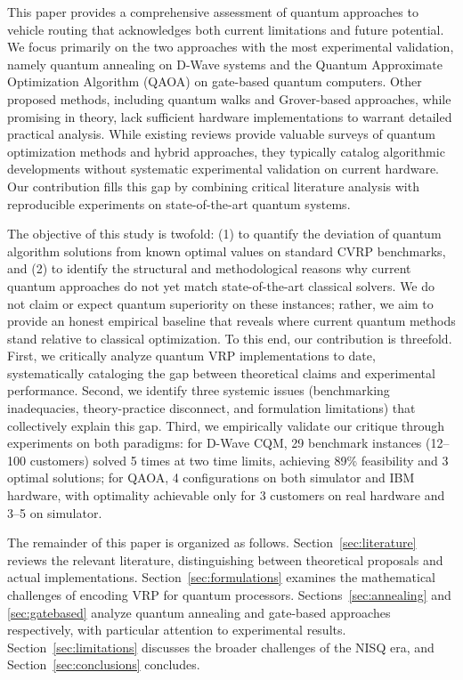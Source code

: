 \documentclass[preprint,3p,12pt,authoryear]{elsarticle}
\begin{document}
This paper provides a comprehensive assessment of quantum approaches to vehicle routing that acknowledges both current limitations and future potential. We focus primarily on the two approaches with the most experimental validation, namely quantum annealing on D-Wave systems and the Quantum Approximate Optimization Algorithm (QAOA) on gate-based quantum computers. Other proposed methods, including quantum walks and Grover-based approaches, while promising in theory, lack sufficient hardware implementations to warrant detailed practical analysis. While existing reviews \citep{yarkoni2022quantum, cerezo2021variational,smartcities8060206,10918658,10087522} provide valuable surveys of quantum optimization methods and hybrid approaches, they typically catalog algorithmic developments without systematic experimental validation on current hardware. Our contribution fills this gap by combining critical literature analysis with reproducible experiments on state-of-the-art quantum systems.

{\color{red}The objective of this study is twofold: (1) to quantify the deviation of quantum algorithm solutions from known optimal values on standard CVRP benchmarks, and (2) to identify the structural and methodological reasons why current quantum approaches do not yet match state-of-the-art classical solvers. We do not claim or expect quantum superiority on these instances; rather, we aim to provide an honest empirical baseline that reveals where current quantum methods stand relative to classical optimization.} To this end, our contribution is threefold. First, we critically analyze quantum VRP implementations to date, systematically cataloging the gap between theoretical claims and experimental performance. Second, we identify three systemic issues (benchmarking inadequacies, theory-practice disconnect, and formulation limitations) that collectively explain this gap. Third, we empirically validate our critique through experiments on both paradigms: for D-Wave CQM, 29 benchmark instances (12--100 customers) solved 5 times at two time limits, achieving 89\% feasibility and 3 optimal solutions; for QAOA, 4 configurations on both simulator and IBM hardware, with optimality achievable only for 3 customers on real hardware and 3--5 on simulator.

The remainder of this paper is organized as follows. Section~\ref{sec:literature} reviews the relevant literature, distinguishing between theoretical proposals and actual implementations. Section~\ref{sec:formulations} examines the mathematical challenges of encoding VRP for quantum processors. Sections~\ref{sec:annealing} and \ref{sec:gatebased} analyze quantum annealing and gate-based approaches respectively, with particular attention to experimental results. Section~\ref{sec:limitations} discusses the broader challenges of the NISQ era, and Section~\ref{sec:conclusions} concludes.
\end{document}
